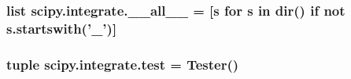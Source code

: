 \subsubsection[{\+\_\+\+\_\+all\+\_\+\+\_\+}]{\setlength{\rightskip}{0pt plus 5cm}list scipy.\+integrate.\+\_\+\+\_\+all\+\_\+\+\_\+ = \mbox{[}{\bf s} for {\bf s} in dir() {\bf if} not s.\+startswith('\+\_\+')\mbox{]}}\label{namespacescipy_1_1integrate_ad887b91b6b93340967dfe82daa61ca1b}
\hypertarget{namespacescipy_1_1integrate_a1bd54dfd45458d7b9cb45d78ee7e9739}{}
\subsubsection[{test}]{\setlength{\rightskip}{0pt plus 5cm}tuple scipy.\+integrate.\+test = Tester()}\label{namespacescipy_1_1integrate_a1bd54dfd45458d7b9cb45d78ee7e9739}
